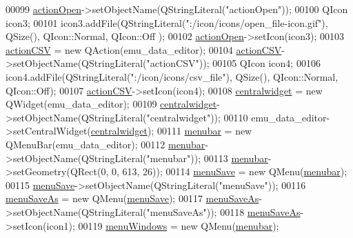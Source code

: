 \begin{DoxyCode}
00099         \hyperlink{a00026_a3ceb57268680eb23f6a3d522b303bb43}{actionOpen}->setObjectName(QStringLiteral(\textcolor{stringliteral}{"actionOpen"}));
00100         QIcon icon3;
00101         icon3.addFile(QStringLiteral(\textcolor{stringliteral}{":/icon/icons/open\_file-icon.gif"}), QSize(), QIcon::Normal, QIcon::Off
      );
00102         \hyperlink{a00026_a3ceb57268680eb23f6a3d522b303bb43}{actionOpen}->setIcon(icon3);
00103         \hyperlink{a00026_afae3d61aac77b6c20a7953b3adba9672}{actionCSV} = \textcolor{keyword}{new} QAction(emu\_data\_editor);
00104         \hyperlink{a00026_afae3d61aac77b6c20a7953b3adba9672}{actionCSV}->setObjectName(QStringLiteral(\textcolor{stringliteral}{"actionCSV"}));
00105         QIcon icon4;
00106         icon4.addFile(QStringLiteral(\textcolor{stringliteral}{":/icon/icons/csv\_file"}), QSize(), QIcon::Normal, QIcon::Off);
00107         \hyperlink{a00026_afae3d61aac77b6c20a7953b3adba9672}{actionCSV}->setIcon(icon4);
00108         \hyperlink{a00026_afff870ab422d2b873976067827089af1}{centralwidget} = \textcolor{keyword}{new} QWidget(emu\_data\_editor);
00109         \hyperlink{a00026_afff870ab422d2b873976067827089af1}{centralwidget}->setObjectName(QStringLiteral(\textcolor{stringliteral}{"centralwidget"}));
00110         emu\_data\_editor->setCentralWidget(\hyperlink{a00026_afff870ab422d2b873976067827089af1}{centralwidget});
00111         \hyperlink{a00026_af09fe2fe1f34525f5caeb5ada7d297bf}{menubar} = \textcolor{keyword}{new} QMenuBar(emu\_data\_editor);
00112         \hyperlink{a00026_af09fe2fe1f34525f5caeb5ada7d297bf}{menubar}->setObjectName(QStringLiteral(\textcolor{stringliteral}{"menubar"}));
00113         \hyperlink{a00026_af09fe2fe1f34525f5caeb5ada7d297bf}{menubar}->setGeometry(QRect(0, 0, 613, 26));
00114         \hyperlink{a00026_a36a184d4c55f5de1b542257cbe23adaf}{menuSave} = \textcolor{keyword}{new} QMenu(\hyperlink{a00026_af09fe2fe1f34525f5caeb5ada7d297bf}{menubar});
00115         \hyperlink{a00026_a36a184d4c55f5de1b542257cbe23adaf}{menuSave}->setObjectName(QStringLiteral(\textcolor{stringliteral}{"menuSave"}));
00116         \hyperlink{a00026_a2568794cbc6cc9907104efbfd79eba7d}{menuSaveAs} = \textcolor{keyword}{new} QMenu(\hyperlink{a00026_a36a184d4c55f5de1b542257cbe23adaf}{menuSave});
00117         \hyperlink{a00026_a2568794cbc6cc9907104efbfd79eba7d}{menuSaveAs}->setObjectName(QStringLiteral(\textcolor{stringliteral}{"menuSaveAs"}));
00118         \hyperlink{a00026_a2568794cbc6cc9907104efbfd79eba7d}{menuSaveAs}->setIcon(icon1);
00119         \hyperlink{a00026_a0c7cba2d30d21689f48f1981e976c0b6}{menuWindows} = \textcolor{keyword}{new} QMenu(\hyperlink{a00026_af09fe2fe1f34525f5caeb5ada7d297bf}{menubar});

\end{DoxyCode}
